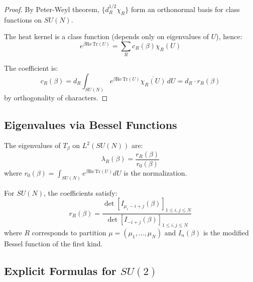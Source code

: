 \begin{proof}
By Peter-Weyl theorem, $\{d_R^{1/2} \chi_R\}$ form an orthonormal basis for 
class functions on $SU(N)$.

The heat kernel is a class function (depends only on eigenvalues of $U$), hence:
\begin{equation}
e^{\beta \mathrm{Re}\,\mathrm{Tr}(U)} = \sum_R c_R(\beta) \chi_R(U)
\end{equation}

The coefficient is:
\begin{equation}
c_R(\beta) = d_R \int_{SU(N)} e^{\beta \mathrm{Re}\,\mathrm{Tr}(U)} \overline{\chi_R(U)} \, dU = d_R \cdot r_R(\beta)
\end{equation}
by orthogonality of characters.
\end{proof}

\subsection{Eigenvalues via Bessel Functions}

\begin{theorem}
\label{thm:eigenvalues}
The eigenvalues of $T_\beta$ on $L^2(SU(N))$ are:
\begin{equation}
\lambda_R(\beta) = \frac{r_R(\beta)}{r_0(\beta)}
\end{equation}
where $r_0(\beta) = \int_{SU(N)} e^{\beta \mathrm{Re}\,\mathrm{Tr}(U)} dU$ is the normalization.

For $SU(N)$, the coefficients satisfy:
\begin{equation}
r_R(\beta) = \frac{\det\left[ I_{\mu_i - i + j}(\beta) \right]_{1 \leq i,j \leq N}}{\det\left[ I_{-i+j}(\beta) \right]_{1 \leq i,j \leq N}}
\end{equation}
where $R$ corresponds to partition $\mu = (\mu_1, \ldots, \mu_N)$ and 
$I_n(\beta)$ is the modified Bessel function of the first kind.
\end{theorem}

\subsection{Explicit Formulas for \texorpdfstring{$SU(2)$}{SU(2)}}

